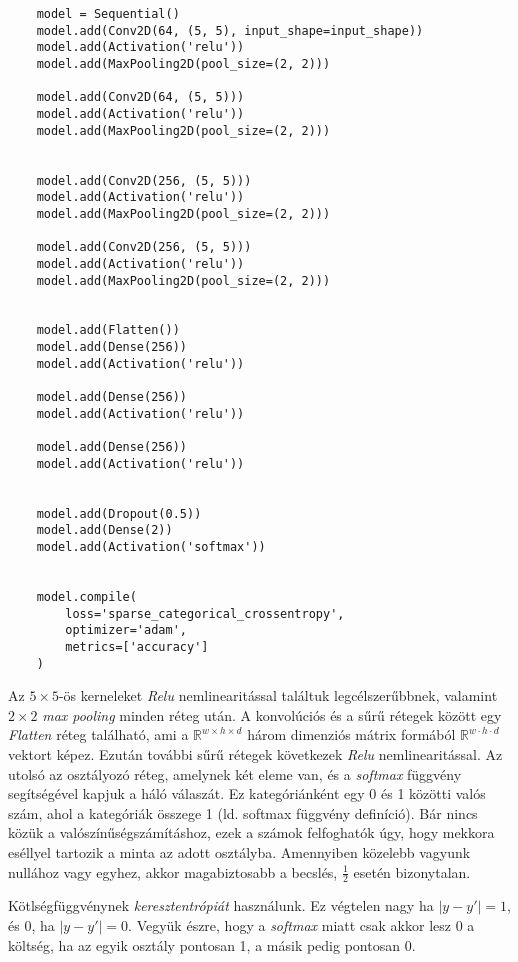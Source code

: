\lstset{language=Python}
\begin{lstlisting}  
	model = Sequential()
	model.add(Conv2D(64, (5, 5), input_shape=input_shape))
	model.add(Activation('relu'))
	model.add(MaxPooling2D(pool_size=(2, 2)))
	
	model.add(Conv2D(64, (5, 5)))
	model.add(Activation('relu'))
	model.add(MaxPooling2D(pool_size=(2, 2)))
	
	
	model.add(Conv2D(256, (5, 5)))
	model.add(Activation('relu'))
	model.add(MaxPooling2D(pool_size=(2, 2)))
	
	model.add(Conv2D(256, (5, 5)))
	model.add(Activation('relu'))
	model.add(MaxPooling2D(pool_size=(2, 2)))
	
	
	model.add(Flatten())
	model.add(Dense(256))
	model.add(Activation('relu'))
	
	model.add(Dense(256))
	model.add(Activation('relu'))
	
	model.add(Dense(256))
	model.add(Activation('relu'))
	
	
	model.add(Dropout(0.5))
	model.add(Dense(2))
	model.add(Activation('softmax'))
	
	
	model.compile(
		loss='sparse_categorical_crossentropy',
		optimizer='adam',
		metrics=['accuracy']
	) 

\end{lstlisting}


Az $ 5 \times 5 $-ös kerneleket \textit{Relu} nemlinearitással találtuk legcélszerűbbnek,
valamint $ 2 \times 2 $ \textit{max pooling} minden réteg után.
A konvolúciós és a sűrű rétegek között egy \textit{Flatten} réteg található,
ami a $ \mathbb{R}^{w \times h \times d} $ három dimenziós mátrix formából 
$ \mathbb{R}^{w \cdot h \cdot d} $ vektort képez. Ezután további sűrű rétegek
következek \textit{Relu} nemlinearitással. Az utolsó az osztályozó
réteg, amelynek két eleme van, és a \textit{softmax} függvény segítségével kapjuk
a háló válaszát. Ez kategóriánként egy 0 és 1 közötti valós szám, ahol a kategóriák 
összege 1 (ld. softmax függvény definíció). Bár nincs közük a valószínűségszámításhoz, 
ezek a számok felfoghatók úgy, hogy mekkora eséllyel tartozik a minta az adott osztályba.
Amennyiben közelebb vagyunk nullához vagy egyhez, akkor magabiztosabb a becslés, 
$ \frac{1}{2} $ esetén bizonytalan.

Kötlségfüggvénynek \textit{keresztentrópiát} használunk. Ez végtelen nagy ha $ |y-y'|=1 $,
és 0, ha $ |y-y'|=0 $. Vegyük észre, hogy a \textit{softmax} miatt csak akkor lesz 0
a költség, ha az egyik osztály pontosan 1, a másik pedig pontosan 0.

